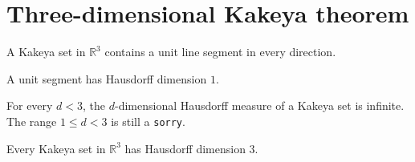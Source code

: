 \section{Three-dimensional Kakeya theorem}

\begin{definition}
\label{def:kakeya-set}
\leanok
A Kakeya set in $\mathbb R^3$ contains a unit line segment in every direction.
\end{definition}

\begin{lemma}
\label{lem:kakeya-segment}
\leanok
{}
A unit segment has Hausdorff dimension $1$.
\end{lemma}

\begin{lemma}
\label{lem:kakeya-measure}
\notready
{}
For every $d<3$, the $d$-dimensional Hausdorff measure of a Kakeya set is infinite. The range $1\le d<3$ is still a \texttt{sorry}.
\end{lemma}

\begin{theorem}
\label{thm:kakeya-3d}
\notready
{}
Every Kakeya set in $\mathbb R^3$ has Hausdorff dimension $3$.
\end{theorem}
